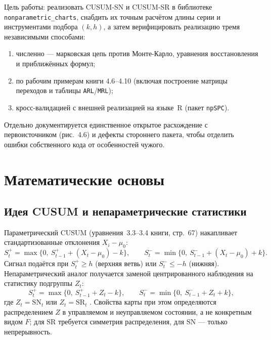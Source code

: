 \documentclass[11pt,a4paper]{article}
\newcommand{\SN}{\mathrm{SN}}
\newcommand{\SR}{\mathrm{SR}}
\begin{document}
Цель работы: реализовать CUSUM-SN и CUSUM-SR в библиотеке
\texttt{nonparametric\_charts}, снабдить их точным расчётом длины серии и
инструментами подбора $(k,h)$, а затем верифицировать реализацию
тремя независимыми способами:
\begin{enumerate}
  \item численно --- марковская цепь против Монте-Карло, уравнения
        восстановления и приближённых формул;
  \item по рабочим примерам книги 4.6--4.10 (включая построение матрицы
        переходов и таблицы \texttt{ARL}/\texttt{MRL});
  \item кросс-валидацией с внешней реализацией на языке~R
        (пакет \texttt{npSPC}).
\end{enumerate}
Отдельно документируется единственное открытое расхождение с
первоисточником (рис.~4.6) и дефекты стороннего пакета, чтобы отделить
ошибки собственного кода от особенностей чужого.

\section{Математические основы}
\label{sec:math}

\subsection{Идея CUSUM и непараметрические статистики}
\label{sec:math-idea}

Параметрический CUSUM (уравнения~3.3--3.4 книги, стр.~67) накапливает
стандартизованные отклонения $X_i-\mu_0$:
\begin{equation}
S_t^+ = \max\{0,\ S_{t-1}^+ + (X_t-\mu_0) - k\},\qquad
S_t^- = \min\{0,\ S_{t-1}^- + (X_t-\mu_0) + k\}.
\label{eq:param-cusum}
\end{equation}
Сигнал подаётся при $S_t^+ \ge h$ (верхняя ветвь) или $S_t^- \le -h$
(нижняя). Непараметрический аналог получается заменой центрированного
наблюдения на статистику подгруппы $Z_t$:
\begin{equation}
S_t^+ = \max\{0,\ S_{t-1}^+ + Z_t - k\},\qquad
S_t^- = \min\{0,\ S_{t-1}^- + Z_t + k\},
\label{eq:cusum-general}
\end{equation}
где $Z_t = \SN_t$ или $Z_t = \SR_t$ \cite[\S4.2.2, стр.~202]{Chakraborti2019}.
Свойства карты при этом определяются распределением $Z$ в управляемом и
неуправляемом состоянии, а не конкретным видом $F$; для $\SR$ требуется
симметрия распределения, для $\SN$ --- только непрерывность.
\end{document}
